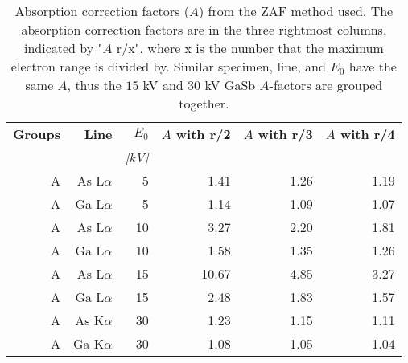 \begin{table}[p]
    \begin{center}
        \caption{
            Absorption correction factors ($A$) from the ZAF method used.
            The absorption correction factors are in the three rightmost columns, indicated by "$A$ r/x", where x is the number that the maximum electron range is divided by.
            Similar specimen, line, and $E_0$ have the same $A$, thus the $15$ kV and $30$ kV GaSb $A$-factors are grouped together.
        }
        \label{tab:results:ZAF_corrections_factors}
        \begin{tabular}{rrrrrr}
            \hline
            \textbf{Groups} & \textbf{Line} & \textbf{$E_0$} & \textbf{$A$ with r/2} & \textbf{$A$ with r/3} & \textbf{$A$ with r/4} \\
            \emph{}         & \emph{}       & \emph{[kV]}    & \emph{}               & \emph{}               & \emph{}               \\
            \hline
            A               & As L$\alpha$  & 5              & 1.41                  & 1.26                  & 1.19                  \\
            A               & Ga L$\alpha$  & 5              & 1.14                  & 1.09                  & 1.07                  \\
            A               & As L$\alpha$  & 10             & 3.27                  & 2.20                  & 1.81                  \\
            A               & Ga L$\alpha$  & 10             & 1.58                  & 1.35                  & 1.26                  \\
            A               & As L$\alpha$  & 15             & 10.67                 & 4.85                  & 3.27                  \\
            A               & Ga L$\alpha$  & 15             & 2.48                  & 1.83                  & 1.57                  \\
            A               & As K$\alpha$  & 30             & 1.23                  & 1.15                  & 1.11                  \\
            A               & Ga K$\alpha$  & 30             & 1.08                  & 1.05                  & 1.04                  \\
            \hline

\end{tabular}
\end{center}
\end{table}
